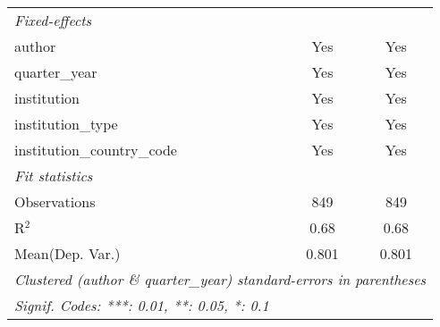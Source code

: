 \begin{tabular}{lcc}
   \midrule
   \emph{Fixed-effects}\\
   author                                   & Yes          & Yes\\  
   quarter\_year                            & Yes          & Yes\\  
   institution                              & Yes          & Yes\\  
   institution\_type                        & Yes          & Yes\\  
   institution\_country\_code               & Yes          & Yes\\  
   \midrule
   \emph{Fit statistics}\\
   Observations                             & 849          & 849\\  
   R$^2$                                    & 0.68         & 0.68\\  
Mean(Dep. Var.) & 0.801 & 0.801 \\
   \midrule \midrule
   \multicolumn{3}{l}{\emph{Clustered (author \& quarter\_year) standard-errors in parentheses}}\\
   \multicolumn{3}{l}{\emph{Signif. Codes: ***: 0.01, **: 0.05, *: 0.1}}\\
\end{tabular}
\par\endgroup
